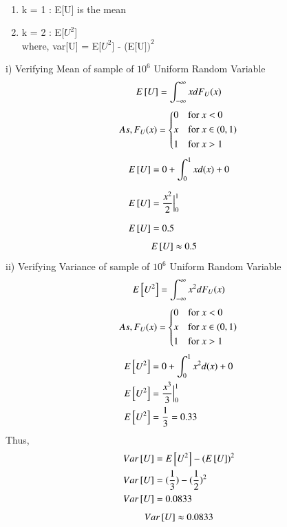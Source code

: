 \documentclass[journal,12pt,twocolumn]{IEEEtran}
\begin{document}
%
\solution \\
\begin{enumerate}
    \item k = 1 : E[U] is the mean
    \item k = 2 : E[$U^2$] \\
    where, var[U] = E[$U^2$] - (E[U$])^2$
\end{enumerate}
i) Verifying Mean of sample of $10^6$ Uniform Random Variable
\begin{align*}
    E{}\left[U\right] &= \int_{-\infty}^{\infty}xdF_{U}(x)\\
\end{align*}
\begin{equation}
    As,F_{U}(x) = 
    \begin{cases*}
        0 & for $x < 0$ \\
        x & for $x \in (0,1)$\\
        1 & for $x > 1$
    \end{cases*}
\end{equation}
\begin{align*}
    E{}\left[U\right] &= 0 + \int_{0}^{1}xd(x) + 0\\[7pt]
    E{}\left[U\right] &= \dfrac{x^2}{2} \Big|_0^1\\[7pt]
    E{}\left[U\right] &= 0.5
\end{align*}
%
    \begin{align}
        E{}\left[U\right] &\approx 0.5
    \end{align}
ii) Verifying Variance of sample of $10^6$ Uniform Random Variable
\begin{align*}
    E{}\left[U^2\right] = \int_{-\infty}^{\infty}x^2dF_{U}(x)
\end{align*}
\begin{equation*}
    As,F_{U}(x) = 
    \begin{cases*}
        0 & for $x < 0$ \\
        x & for $x \in (0,1)$\\
        1 & for $x > 1$
    \end{cases*}
\end{equation*}
\begin{align*}
        E{}\left[U^2\right] &= 0+\int_{0}^{1}x^2d(x)+0\\
        E{}\left[U^2\right] &= \dfrac{x^3}{3} \Big|_0^1\\
        E{}\left[U^2\right] &= \dfrac{1}{3} = 0.33 \\
    \end{align*}
Thus,
\begin{align*}
    Var{}\left[U\right] &= E{}\left[U^2\right] - (E{}\left[U\right])^2\\
    Var{}\left[U\right] &= (\dfrac{1}{3}) - (\dfrac{1}{2})^2\\
    Var{}\left[U\right] &= 0.0833
    \end{align*}
%    
    \begin{align}
        Var{}\left[U\right] \approx 0.0833
    \end{align}
\end{document}
